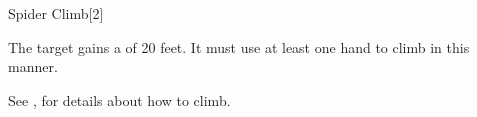 \begin{spellsection}{Spider Climb}[2]
    \begin{spellheader}
    \end{spellheader}
    \begin{spellcontent}
        \begin{spelltargetinginfo}
        \end{spelltargetinginfo}
        \begin{spelleffects}
            \spelleffect The target gains a  of 20 feet. It must use at least one hand to climb in this manner.
            \spelldur \durmed
        \end{spelleffects}
    \end{spellcontent}
    \begin{spellfooter}
        \spellnotes See , for details about how to climb.
        \miscastexplode
    \end{spellfooter}
    \begin{spellaugments}
    \end{spellaugments}
\end{spellsection}


